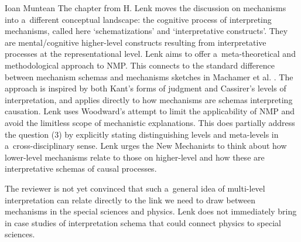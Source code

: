 \begin{recengenv}{Ioan Muntean}
The chapter from H. Lenk moves the discussion on mechanisms into a~different conceptual landscape: the cognitive process of interpreting mechanisms, called here ‘schematizations' and ‘interpretative constructs'. They are mental/cognitive higher-level constructs resulting from interpretative processes at the representational level. Lenk aims to offer a~meta-theoretical and methodological approach to NMP. This connects to the standard difference between mechanism schemas and mechanisms sketches in Machamer et al.
\parencite*[][]{machamer_thinking_2000}. %
 The approach is inspired by both Kant's forms of judgment and Cassirer's levels of interpretation, and applies directly to how mechanisms are schemas interpreting causation. Lenk uses Woodward's 
\parencite*[][]{woodward_mechanistic_2013} %
 attempt to limit the applicability of NMP and avoid the limitless scope of mechanistic explanations. This does partially address the question (3) by explicitly stating distinguishing levels and meta-levels in a~cross-disciplinary sense. Lenk urges the New Mechanists to think about how lower-level mechanisms relate to those on higher-level and how these are interpretative schemas of causal processes.

The reviewer is not yet convinced that such a~general idea of multi-level interpretation can relate directly to the link we need to draw between mechanisms in the special sciences and physics. Lenk does not immediately bring in case studies of interpretation schema that could connect physics to special sciences.


\end{recengenv}
